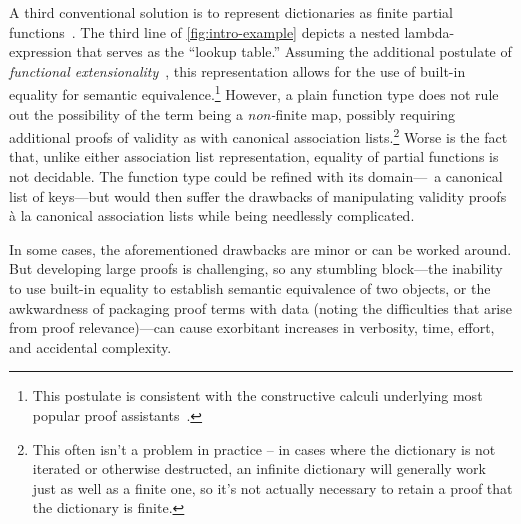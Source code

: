 A third conventional solution is to represent dictionaries as finite partial functions~\citep{XXX,XXX,XXX}.
%
The third line of \autoref{fig:intro-example} depicts a nested lambda-expression that serves as the ``lookup table.'' 
%
Assuming the additional postulate of \emph{functional extensionality}~\cite{XXX}, this representation allows for the use of built-in equality for semantic equivalence.\footnote{\hspace{0.01in}%
%
This postulate is consistent with the constructive calculi underlying most popular proof assistants~\citep{XXX}.
%
}
%
However, a plain function type does not rule out the possibility of the term being a \emph{non-}finite map, possibly requiring additional proofs of validity as with canonical association lists.\footnote{\hspace{0.01in}%
%
This often isn't a problem in practice -- in cases where the dictionary is not iterated or otherwise destructed, an infinite dictionary will generally work just as well as a finite one,
%
so it's not actually necessary to retain a proof that the dictionary is finite.
%
}
%
Worse is the fact that, unlike either association list representation, equality of partial functions is not decidable.
%
The function type could be refined with its domain---\ie{}~a canonical list of keys---but would then suffer the drawbacks of manipulating validity proofs \`{a} la canonical association lists while being needlessly complicated.

In some cases, the aforementioned drawbacks are minor or can be worked around.
%
But developing large proofs is challenging, so any stumbling block---the inability to use built-in equality to establish semantic equivalence of two objects, or the awkwardness of packaging proof terms with data (noting the difficulties that arise from proof relevance)---can cause exorbitant increases in verbosity, time, effort, and accidental complexity.



